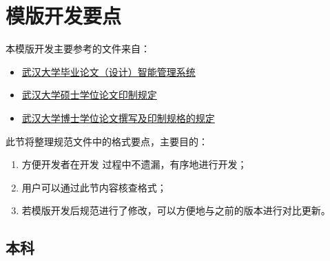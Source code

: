 

\section{模版开发要点}

本模版开发主要参考的文件来自：

\begin{itemize}
  \item \href{http://210.42.121.231/bysj/}{武汉大学毕业论文（设计）智能管理系统}
  \item \href{https://gs.whu.edu.cn/info/1026/1096.htm}{武汉大学硕士学位论文印制规定}
  \item \href{https://gs.whu.edu.cn/info/1026/1100.htm}{武汉大学博士学位论文撰写及印制规格的规定}
\end{itemize}

此节将整理规范文件中的格式要点，主要目的：

\begin{enumerate}
  \item 方便开发者在开发  过程中不遗漏，有序地进行开发；
  \item 用户可以通过此节内容核查格式；
  \item 若模版开发后规范进行了修改，可以方便地与之前的版本进行对比更新。
\end{enumerate}







\subsection{本科}

